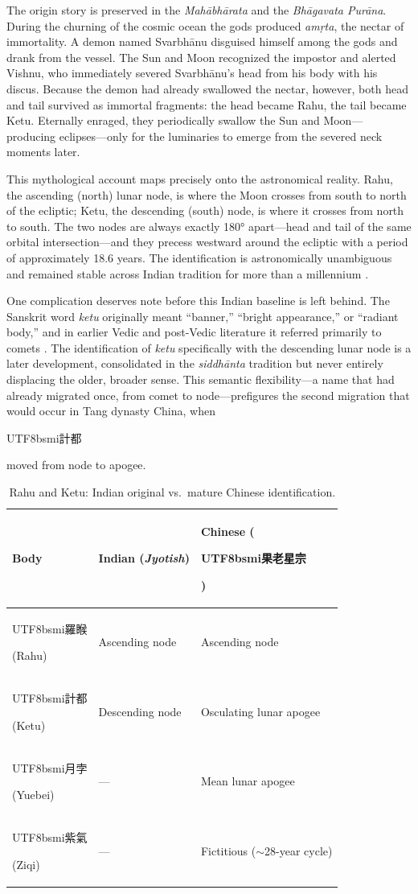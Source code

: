 \documentclass[10pt,a4paper]{article}
\newcommand{\zh}[1]{\begin{CJK}{UTF8}{bsmi}#1\end{CJK}}
\begin{document}
The origin story is preserved in the \textit{Mah\=abh\=arata} and the
\textit{Bh\=agavata Pur\=ana}.  During the churning of the cosmic ocean the gods
produced \textit{am\d{r}ta}, the nectar of immortality.  A demon named
Svarbh\=anu disguised himself among the gods and drank from the vessel.  The Sun
and Moon recognized the impostor and alerted Vishnu, who immediately severed
Svarbh\=anu's head from his body with his discus.  Because the demon had already
swallowed the nectar, however, both head and tail survived as immortal fragments:
the head became Rahu, the tail became Ketu.  Eternally enraged, they periodically
swallow the Sun and Moon---producing eclipses---only for the luminaries to emerge
from the severed neck moments later.

This mythological account maps precisely onto the astronomical reality.  Rahu,
the ascending (north) lunar node, is where the Moon crosses from south to north
of the ecliptic; Ketu, the descending (south) node, is where it crosses from
north to south.  The two nodes are always exactly 180° apart---head and tail of
the same orbital intersection---and they precess westward around the ecliptic
with a period of approximately 18.6 years.  The identification is astronomically
unambiguous and remained stable across Indian tradition for more than a millennium
\cite{pingree1981jyotih}.

One complication deserves note before this Indian baseline is left behind.  The
Sanskrit word \textit{ketu} originally meant ``banner,'' ``bright appearance,''
or ``radiant body,'' and in earlier Vedic and post-Vedic literature it referred
primarily to comets \cite[p.~47]{kotyk2018sinicization}.  The identification of
\textit{ketu} specifically with the descending lunar node is a later development,
consolidated in the \textit{siddh\=anta} tradition but never entirely displacing
the older, broader sense.  This semantic flexibility---a name that had already
migrated once, from comet to node---prefigures the second migration that would
occur in Tang dynasty China, when \zh{計都} moved from node to apogee.

\begin{table}[ht]
\centering
\small
\caption{Rahu and Ketu: Indian original vs.\ mature Chinese identification.}
\label{tab:rahu-ketu}
\begin{tabular}{@{}lll@{}}
\toprule
Body & Indian (\textit{Jyotish}) & Chinese (\zh{果老星宗}) \\
\midrule
\zh{羅睺} (Rahu) & Ascending node & Ascending node \\
\zh{計都} (Ketu) & Descending node & Osculating lunar apogee \\
\zh{月孛} (Yuebei) & --- & Mean lunar apogee \\
\zh{紫氣} (Ziqi) & --- & Fictitious ($\sim$28-year cycle) \\
\bottomrule
\end{tabular}
\end{table}
\end{document}

